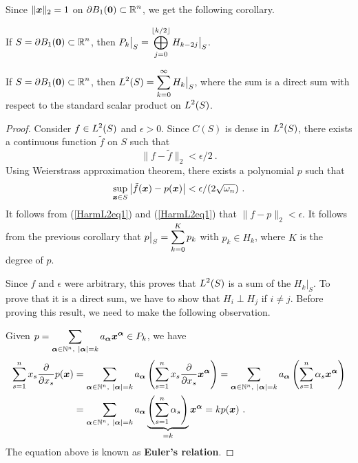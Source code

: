 Since $\|\VEC{x}\|_2 = 1$ on
$\DS \partial B_1(\VEC{0}) \subset \RR^n$, we
get the following corollary.

\begin{cor}
If $\DS S = \partial B_1(\VEC{0}) \subset \RR^n$, then
$\DS P_k\big|_S = \bigoplus_{j=0}^{\intpt{k/2}} H_{k-2j}\big|_S$.
\end{cor}

\begin{theorem} \label{L2DecHk}
If $\DS S = \partial B_1(\VEC{0}) \subset \RR^n$, then
$\DS L^2(S) = \sum_{k=0}^\infty H_k\big|_S$, where the sum
is a direct sum with respect to the standard scalar product on
$\DS L^2(S)$.
\end{theorem}

\begin{proof}
Consider $\DS f \in L^2(S)$ and $\epsilon >0$.  Since $C(S)$
is dense in $\DS L^2(S)$, there exists a continuous function
$\tilde{f}$ on $S$ such that
\begin{equation} \label{HarmL2eq1}
  \|f - \tilde{f}\|_2 < \epsilon/2 \ .
\end{equation}
Using Weierstrass approximation theorem, there exists a polynomial $p$
such that
\begin{equation} \label{HarmL2eq2}
\sup_{\VEC{x} \in S} \big|\tilde{f}(\VEC{x}) - p(\VEC{x})\big|
< \epsilon/(2\sqrt{\omega_n}) \ .
\end{equation}
It follows from (\ref{HarmL2eq1}) and (\ref{HarmL2eq1}) that
$\|f - p \|_2 < \epsilon$.
It follows from the previous corollary that
$\DS p\big|_S = \sum_{k=0}^K p_k$ with
$p_k \in H_k$, where $K$ is the degree of $p$.

Since $f$ and $\epsilon$ were arbitrary, this proves that
$\DS L^2(S)$ is a sum of the $H_k\big|_S$.  To prove that it
is a direct sum, we have to show that $H_i \perp H_j$ if $i \neq j$.  Before
proving this result, we need to make the following observation.

Given $\DS p = \sum_{\VEC{\alpha} \in \NN^n,\ |\VEC{\alpha}| = k}
a_{\VEC{\alpha}} \VEC{x}^{\VEC{\alpha}} \in P_k$, we have
\begin{align*}
\sum_{s=1}^n x_s \pdfdx{p}{x_s}(\VEC{x})
& = \sum_{\VEC{\alpha} \in \NN^n,\ |\VEC{\alpha}| = k} a_{\VEC{\alpha}}
\left( \sum_{s=1}^n x_s \pdydx{}{x_s} \VEC{x}^{\VEC{\alpha}} \right)
 =  \sum_{\VEC{\alpha} \in \NN^n,\ |\VEC{\alpha}| = k} a_{\VEC{\alpha}}
\left( \sum_{s=1}^n \alpha_s \VEC{x}^{\VEC{\alpha}} \right) \\
&=  \sum_{\VEC{\alpha} \in \NN^n,\ |\VEC{\alpha}| = k} a_{\VEC{\alpha}}
\underbrace{\left( \sum_{s=1}^n \alpha_s\right)}_{=k} \VEC{x}^{\VEC{\alpha}}
= k p(\VEC{x}) \ .
\end{align*}
The equation above is known as {\bfseries Euler's relation}.


\end{proof}
